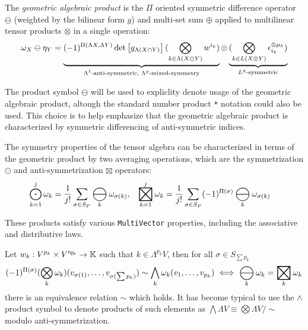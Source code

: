 \documentclass{juliacon}
\DeclareMathOperator*{\bigboxtimes}{\scalerel*{\boxtimes}{\bigodot}}
\DeclareMathOperator*{\bigominus}{\scalerel*{\ominus}{\bigodot}}
\begin{document}
\begin{definition}
	The \textit{geometric algebraic product} is the $\Pi$ oriented symmetric difference operator $\ominus$ (weighted by the bilinear form $g$) and multi-set sum $\oplus$ applied to multilinear tensor products $\otimes$ in a single operation:
	$$ \omega_X\ominus \eta_Y = \ub{\text{$\Lambda^1$-anti-symmetric, $\Lambda^g$-mixed-symmetry}}{(-1)^{\Pi(\Lambda X,\Lambda Y)}\det\mat{g_{\Lambda(X\cap Y)}} (\bigotimes_{k\in \Lambda(X\ominus Y)} w^{i_k})}\otimes \ub{\text{$L^g$-symmetric}}{(\bigotimes_{k\in L(X\oplus Y)} \epsilon_{i_k}^{\otimes\mu_k})}$$
\end{definition}

\begin{note}
	The product symbol $\ominus$ will be used to expliclity denote usage of the geometric algebraic product, altough the standard number product \verb`*` notation could also be used. This choice is to help emphasize that the geometric algebraic product is characterized by symmetric differencing of anti-symmetric indices.
\end{note}

\begin{definition}
	The symmetry properties of the tensor algebra can be characterized in terms of the geometric product by two averaging operations, which are the symmetrization $\odot$ and anti-symmetrization $\boxtimes$ operators:
	\begin{align*}
		\bigodot_{k=1}^j \omega_k &= \frac1{j!}\sum_{\sigma\in S_P}\bigominus_k\omega_{\sigma(k)}, &
		\bigboxtimes_{k=1}^j \omega_k &= \frac1{j!}\sum_{\sigma\in S_P}(-1)^{\Pi(\sigma)}\bigominus_k\omega_{\sigma(k)}
	\end{align*}
\end{definition}
These products satisfy various \verb`MultiVector` properties, including the associative and distributive laws.

\begin{definition}
	Let $w_k:V^{p_k}\times V'^{q_k}\ra\mb K$ such that $k\in\Lambda^{p_k}V$, then for all $\sigma\in S_{\sum p_k}$
	$$ (-1)^{\Pi(\sigma)}(\bigotimes_k \omega_k)(v_{\sigma(1)},\dots,v_{\sigma(\sum p_k)}) \sim \bigwedge_k \omega_k(v_{1},\dots,v_{p_k}) \iff \bigominus_k\omega_k = \bigboxtimes_k\omega_k $$
	there is an equivalence relation $\sim$ which holds. It has become typical to use the $\wedge$ product symbol to denote products of such elements as $\bigwedge\Lambda V \equiv \bigotimes\Lambda V/\sim$ modulo anti-symmetrization.
\end{definition}
\end{document}
